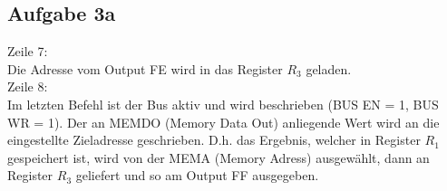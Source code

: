 \documentclass[paper=a4, fontsize=11pt]{scrartcl}
\numberwithin{equation}{section}
\numberwithin{figure}{section}
\numberwithin{table}{section}
\begin{document}
\subsection{Aufgabe 3a}

Zeile 7: \\
Die Adresse vom Output FE wird in das Register $R_{3}$ geladen. \\

Zeile 8: \\
Im letzten Befehl ist der Bus aktiv und wird beschrieben (BUS EN = 1, BUS WR = 1). Der an MEMDO (Memory Data Out) anliegende Wert wird an die eingestellte Zieladresse geschrieben. D.h. das Ergebnis, welcher in Register $R_{1}$ gespeichert ist, wird von der MEMA (Memory Adress) ausgewählt, dann an Register $R_{3}$ geliefert und so am Output FF ausgegeben.
\end{document}
